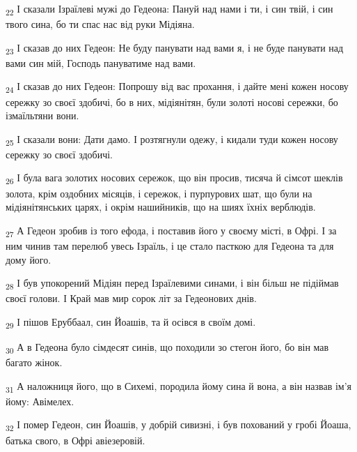 \begin{tcolorbox}
\textsubscript{22} І сказали Ізраїлеві мужі до Гедеона: Пануй над нами і ти, і син твій, і син твого сина, бо ти спас нас від руки Мідіяна.
\end{tcolorbox}
\begin{tcolorbox}
\textsubscript{23} І сказав до них Гедеон: Не буду панувати над вами я, і не буде панувати над вами син мій, Господь пануватиме над вами.
\end{tcolorbox}
\begin{tcolorbox}
\textsubscript{24} І сказав до них Гедеон: Попрошу від вас прохання, і дайте мені кожен носову сережку зо своєї здобичі, бо в них, мідіянітян, були золоті носові сережки, бо ізмаїльтяни вони.
\end{tcolorbox}
\begin{tcolorbox}
\textsubscript{25} І сказали вони: Дати дамо. І розтягнули одежу, і кидали туди кожен носову сережку зо своєї здобичі.
\end{tcolorbox}
\begin{tcolorbox}
\textsubscript{26} І була вага золотих носових сережок, що він просив, тисяча й сімсот шеклів золота, крім оздобних місяців, і сережок, і пурпурових шат, що були на мідіянітянських царях, і окрім нашийників, що на шиях їхніх верблюдів.
\end{tcolorbox}
\begin{tcolorbox}
\textsubscript{27} А Гедеон зробив із того ефода, і поставив його у своєму місті, в Офрі. І за ним чинив там перелюб увесь Ізраїль, і це стало пасткою для Гедеона та для дому його.
\end{tcolorbox}
\begin{tcolorbox}
\textsubscript{28} І був упокорений Мідіян перед Ізраїлевими синами, і він більш не підіймав своєї голови. І Край мав мир сорок літ за Гедеонових днів.
\end{tcolorbox}
\begin{tcolorbox}
\textsubscript{29} І пішов Еруббаал, син Йоашів, та й осівся в своїм домі.
\end{tcolorbox}
\begin{tcolorbox}
\textsubscript{30} А в Гедеона було сімдесят синів, що походили зо стегон його, бо він мав багато жінок.
\end{tcolorbox}
\begin{tcolorbox}
\textsubscript{31} А наложниця його, що в Сихемі, породила йому сина й вона, а він назвав ім'я йому: Авімелех.
\end{tcolorbox}
\begin{tcolorbox}
\textsubscript{32} І помер Гедеон, син Йоашів, у добрій сивизні, і був похований у гробі Йоаша, батька свого, в Офрі авіезеровій.
\end{tcolorbox}
